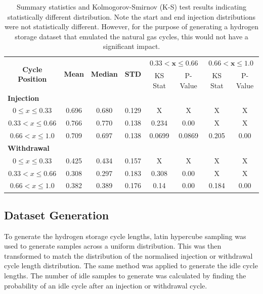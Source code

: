 \begin{table}[htbp]
    \centering
    \renewcommand{\arraystretch}{1.25}
    \begin{tabular}{c c c c c c c c}
    \toprule
    \multirow{2}{*}{\textbf{Cycle Position}} & \multirow{2}{*}{\textbf{Mean}} & \multirow{2}{*}{\textbf{Median}} & \multirow{2}{*}{\textbf{STD}} & \multicolumn{2}{c}{$\mathbf{0.33 < x \leq 0.66}$} & \multicolumn{2}{c}{$\mathbf{0.66 < x \leq 1.0}$} \\
     & & & & KS Stat & P-Value & KS Stat & P-Value \\
    \midrule
    \multicolumn{8}{l}{\textbf{Injection}} \\
    \midrule
    $0 \leq x \leq 0.33$   & 0.696 & 0.680 & 0.129 & X      & X      & X     & X    \\
    $0.33 < x \leq 0.66$   & 0.766 & 0.770 & 0.138 & 0.234  & 0.00   & X     & X    \\
    $0.66 < x \leq 1.0$    & 0.709 & 0.697 & 0.138 & 0.0699 & 0.0869 & 0.205 & 0.00 \\
    \midrule
    \multicolumn{8}{l}{\textbf{Withdrawal}} \\
    \midrule
    $0 \leq x \leq 0.33$   & 0.425 & 0.434 & 0.157 & X     & X    & X     & X    \\
    $0.33 < x \leq 0.66$   & 0.308 & 0.297 & 0.183 & 0.308 & 0.00 & X     & X    \\
    $0.66 < x \leq 1.0$    & 0.382 & 0.389 & 0.176 & 0.14  & 0.00 & 0.184 & 0.00 \\
    \bottomrule
    \end{tabular}
    \caption{Summary statistics and Kolmogorov-Smirnov (K-S) test results indicating statistically different distribution. Note the start and end injection distributions were not statistically different. However, for the purpose of generating a hydrogen storage dataset that emulated the natural gas cycles, this would not have a significant impact.}
    \label{tab:combined_stats_ks}
\end{table}


\subsection{Dataset Generation}

To generate the hydrogen storage cycle lengths, latin hypercube sampling was used to generate samples across a uniform distribution. This was then transformed to match the distribution of the normalised injection or withdrawal cycle length distribution.  The same method was applied to generate the idle cycle lengths. The number of idle samples to generate was calculated by finding the probability of an idle cycle after an injection or withdrawal cycle.

